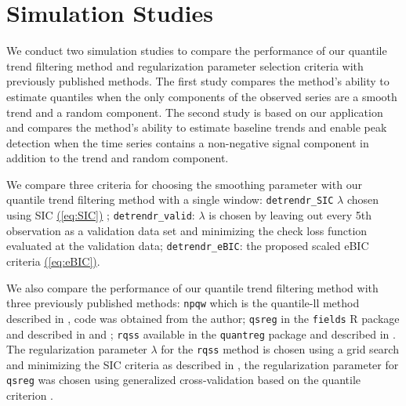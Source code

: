 \documentclass[aoas]{imsart}
\newcommand{\Eqn}[1]{\hyperref[eq:#1]{{\rm (\ref*{eq:#1})}}} %
\newcommand{\Eqn}[1]{{(\ref{eq:#1})}} %
\begin{document}
\section{Simulation Studies}
\label{sec:simluation}

We conduct two simulation studies to compare the performance of our quantile trend filtering method and regularization parameter selection criteria with previously published methods. The first study compares the method's ability to estimate quantiles when the only components of the observed series are a smooth trend and a random component. The second study is based on our application and compares the method's ability to estimate baseline trends and enable peak detection when the time series contains a non-negative signal component in addition to the trend and random component.

We compare three criteria for choosing the smoothing parameter with our quantile trend filtering method with a single window: \texttt{detrendr\_SIC} $\lambda$ chosen using SIC \Eqn{SIC} \citep{KoenkerNgPortnoy1994}; \texttt{detrendr\_valid}: $\lambda$ is chosen by leaving out every 5th observation as a validation data set and minimizing the check loss function evaluated at the validation data; \texttt{detrendr\_eBIC}:  the proposed scaled eBIC criteria \Eqn{eBIC}.

We also compare the performance of our quantile trend filtering method with three previously published methods: \texttt{npqw} which is the quantile-ll method described in \cite{Racine2017}, code was obtained from the author; \texttt{qsreg} in the \texttt{fields} R package and described in \cite{Oh2011} and \cite{nychka1995nonparametric}; \texttt{rqss} available in the \texttt{quantreg} package and described in \cite{KoenkerNgPortnoy1994}.  The regularization parameter $\lambda$ for the \texttt{rqss} method is chosen using a grid search and minimizing the SIC criteria as described in \cite{KoenkerNgPortnoy1994}, the regularization parameter for \texttt{qsreg} was chosen using generalized cross-validation based on the quantile criterion \cite{Oh2011}.

\end{document}
